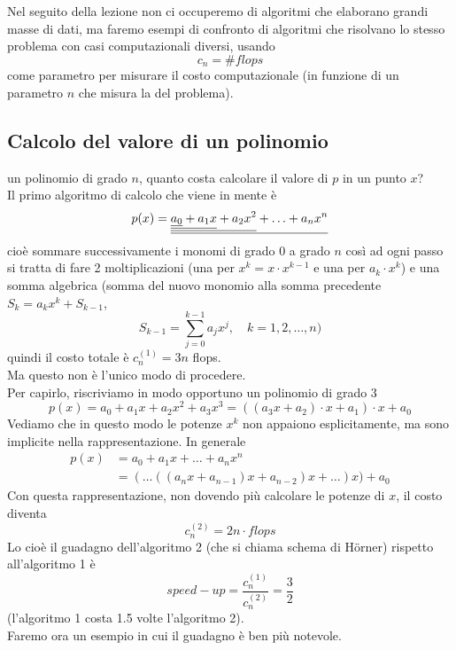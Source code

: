 \documentclass[12pt]{article}
\begin{document}
\bigskip
Nel seguito della lezione non ci occuperemo di algoritmi che elaborano grandi masse di dati, ma faremo esempi di confronto di algoritmi che risolvano lo stesso problema con casi computazionali diversi, usando \[c_n = \# flops\] come parametro per misurare il costo computazionale (in funzione di un parametro $n$ che misura la  del problema). 

\subsection{Calcolo del valore di un polinomio}
un polinomio di grado $n$, quanto costa calcolare il valore di $p$ in un punto $x$? \\
Il primo algoritmo di calcolo che viene in mente è 
\[p(x) = \uline{\uline{\uline{\uline{a_0} + a_1x} + a_2x^2} + \dotsc + a_nx^n}\]
cioè sommare successivamente i monomi di grado 0 a grado $n$ così ad ogni passo si tratta di fare 2 moltiplicazioni (una per $x^k = x \cdot x^{k-1}$ e una per $a_k\cdot x^k$) e una somma algebrica (somma del nuovo monomio alla somma precedente $S_k = a_k x^k + S_{k-1}$, 
\[S_{k-1}=\sum_{j=0}^{k-1} a_j x^j,\quad k = 1,2,\dotsc,n)\]
quindi il costo totale è $c^{(1)}_{n} = 3n$ flops. \\
Ma questo non è l'unico modo di procedere.\\
Per capirlo, riscriviamo in modo opportuno un polinomio di grado 3
\[p(x) = a_0 + a_1x + a_2 x^2 + a_3 x^3 = ((a_3 x + a_2) \cdot x + a_1) \cdot x + a_0 \]
Vediamo che in questo modo le potenze $x^k$ non appaiono esplicitamente, ma sono implicite nella rappresentazione. In generale
\[\begin{split}
    p(x) & = a_0 + a_1x + \dotsc + a_nx^n \\
    & = (\dotsc((a_n x + a_{n-1}) x + a_{n-2}) x + \dotsc) x) + a_0 
\end{split}\]
Con questa rappresentazione, non dovendo più calcolare le potenze di $x$, il costo diventa
\[ c_n^{(2)}=2n\cdot flops \]
Lo  cioè il guadagno dell'algoritmo 2 (che si chiama schema di H\"orner) rispetto all'algoritmo 1 è
\[speed-up=\frac{c_n^{(1)}}{c_n^{(2)}}=\frac{3}{2}\]
(l'algoritmo 1 costa 1.5 volte l'algoritmo 2).\\ 
Faremo ora un esempio in cui il guadagno è ben più notevole.\newline
\end{document}
